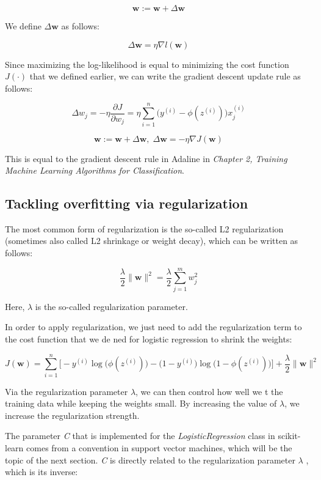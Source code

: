 \documentclass[letterpaper]{report}
\begin{document}
\[
\mathbf{w} := \mathbf{w} + \Delta \mathbf{w}
\]

We define $\Delta \mathbf{w}$ as follows:

\[
\Delta \mathbf{w} = \eta \nabla l (\mathbf{w})
\]

Since maximizing the log-likelihood is equal to minimizing the cost function $J(\cdot)$ that we defined earlier, we can write the gradient descent update rule as follows:

\[
\Delta w_j = - \eta \frac{\partial J}{\partial w_j} = \eta \sum_{i=1}^{n} \bigg( y^{(i)} - \phi(z^{(i)}) \bigg)x_{j}^{(i)}
\]

\[
\mathbf{w} := \mathbf{w} + \Delta \mathbf{w}, \; \Delta \mathbf{w} = - \eta \nabla J(\mathbf{w})
\]

This is equal to the gradient descent rule in Adaline in \textit{Chapter 2, Training Machine Learning Algorithms for Classification}.


\subsection{Tackling overfitting via regularization}

The most common form of regularization is the so-called L2 regularization (sometimes also called L2 shrinkage or weight decay), which can be written as follows:

\[
\frac{\lambda}{2} \lVert \mathbf{w} \rVert^2 = \frac{\lambda}{2} \sum_{j=1}^m w_{j}^{2}
\]

Here, $\lambda$ is the so-called regularization parameter.

In order to apply regularization, we just need to add the regularization term to the cost function that we de ned for logistic regression to shrink the weights:

\[
J(\mathbf{w}) = \sum_{i=1}^{n} \bigg[ - y^{(i)} \log \big(  \phi(z^{(i)})  \big)  - \big( 1 - y ^{(i)} \big)  \log \big( 1 - \phi(z^{(i)})   \big)   \bigg] + \frac{\lambda}{2} \lVert \mathbf{w}\rVert^2  
\]

Via the regularization parameter $\lambda$, we can then control how well we  t the training data while keeping the weights small. By increasing the value of $\lambda$, we increase the regularization strength. 

The parameter \textit{C} that is implemented for the \textit{LogisticRegression} class in scikit-learn comes from a convention in support vector machines, which will be the topic of the next section. \textit{C} is directly related to the regularization parameter $\lambda$ , which is its inverse:
\end{document}
